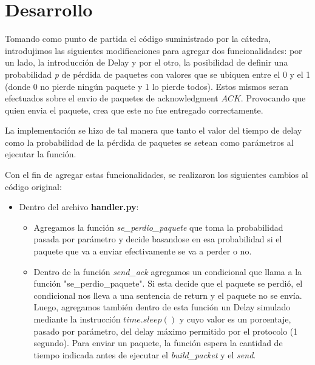 \section{Desarrollo}

Tomando como punto de partida el c\'odigo suministrado por la cátedra, introdujimos las siguientes modificaciones para agregar dos funcionalidades: por un lado, la introducción de Delay y por el otro, la posibilidad de definir una probabilidad \textit{p} de pérdida de paquetes con valores que se ubiquen entre el 0 y el 1 (donde 0 no pierde ningún paquete y 1 lo pierde todos). Estos mismos seran efectuados sobre el envio de paquetes de acknowledgment $ACK$. Provocando que quien envia el paquete, crea que este no fue entregado correctamente.

La implementación se hizo de tal manera que tanto el valor del tiempo de delay como la probabilidad de la p\'erdida de paquetes se setean como par\'ametros al ejecutar la funci\'on.

Con el fin de agregar estas funcionalidades, se realizaron los siguientes cambios al c\'odigo original:

\begin{itemize}

\item Dentro del archivo \textbf{handler.py}:

\begin{itemize}

\item Agregamos la funci\'on \textit{se\_perdio\_paquete} que toma la probabilidad pasada por parámetro y decide basandose en esa probabilidad si el paquete que va a enviar efectivamente se va a perder o no.

\item Dentro de la función \textit{send\_ack} agregamos un condicional que llama a la función "se\_perdio\_paquete".
Si esta decide que el paquete se perdió, el condicional nos lleva a una sentencia de return y el paquete no se envía.
Luego, agregamos también dentro de esta función un Delay simulado mediante la instrucción $time.sleep()$ y cuyo valor es un porcentaje, pasado por par\'ametro, del delay m\'aximo permitido por el protocolo (1 segundo). Para enviar un paquete, la función espera la cantidad de tiempo indicada antes de ejecutar el \textit{build\_packet} y el \textit{send}.

\end{itemize}
\end{itemize}

